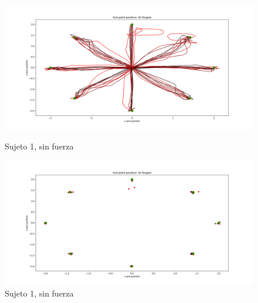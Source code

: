 \documentclass[a4paper,11pt, oneside]{book}
\begin{document}
\begin{figure}[H]
	\begin{minipage}[b]{0.5\linewidth}
		\centering
		\includegraphics[width=\linewidth]{sujeto1/no_force/trayectorias}
		\caption{Sujeto 1, sin fuerza}
		\label{fig:figura1}
	\end{minipage}
	\hspace{0.5cm}
	\begin{minipage}[b]{0.5\linewidth}
		\centering
		\includegraphics[width=\linewidth]{sujeto1/no_force/trayectorias_puntos}
		\caption{Sujeto 1, sin fuerza}
		\label{fig:figura2}
	\end{minipage}
\end{figure}
\end{document}
